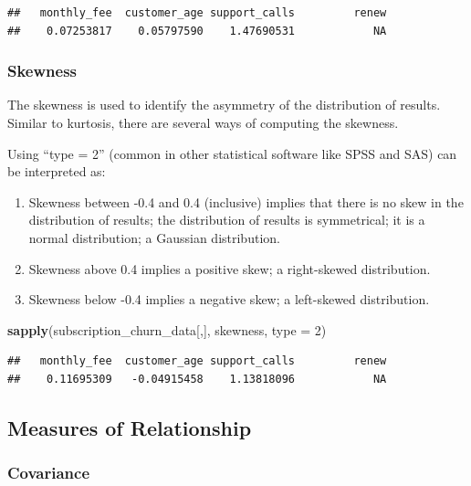 \documentclass[
]{article}
\newenvironment{Shaded}{\begin{snugshade}}{\end{snugshade}}
\newcommand{\AttributeTok}[1]{\textcolor[rgb]{0.13,0.29,0.53}{#1}}
\newcommand{\DecValTok}[1]{\textcolor[rgb]{0.00,0.00,0.81}{#1}}
\newcommand{\FunctionTok}[1]{\textcolor[rgb]{0.13,0.29,0.53}{\textbf{#1}}}
\newcommand{\NormalTok}[1]{#1}
\begin{document}
\begin{verbatim}
##   monthly_fee  customer_age support_calls         renew 
##    0.07253817    0.05797590    1.47690531            NA
\end{verbatim}

\subsubsection{Skewness}\label{skewness}

The skewness is used to identify the asymmetry of the distribution of
results. Similar to kurtosis, there are several ways of computing the
skewness.

Using ``type = 2'' (common in other statistical software like SPSS and
SAS) can be interpreted as:

\begin{enumerate}
\def\labelenumi{\arabic{enumi}.}
\item
  Skewness between -0.4 and 0.4 (inclusive) implies that there is no
  skew in the distribution of results; the distribution of results is
  symmetrical; it is a normal distribution; a Gaussian distribution.
\item
  Skewness above 0.4 implies a positive skew; a right-skewed
  distribution.
\item
  Skewness below -0.4 implies a negative skew; a left-skewed
  distribution.
\end{enumerate}

\begin{Shaded}
\begin{Highlighting}[]
\FunctionTok{sapply}\NormalTok{(subscription\_churn\_data[,], skewness, }\AttributeTok{type =} \DecValTok{2}\NormalTok{)}
\end{Highlighting}
\end{Shaded}

\begin{verbatim}
##   monthly_fee  customer_age support_calls         renew 
##    0.11695309   -0.04915458    1.13818096            NA
\end{verbatim}

\subsection{Measures of Relationship}\label{measures-of-relationship}

\subsubsection{Covariance}\label{covariance}
\end{document}
